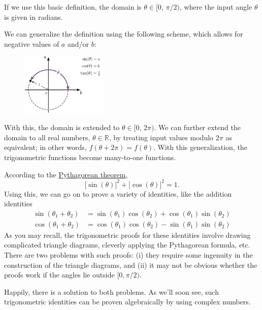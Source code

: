 \documentclass[10pt,a4paper]{article}
\begin{document}
\noindent
If we use this basic definition, the domain is $\theta \in [0,
  \,\pi/2)$, where the input angle $\theta$ is given in radians.

We can generalize the definition using the following scheme, which
allows for negative values of $a$ and/or $b$:

\begin{figure}[h!]
  \centering\includegraphics[width=0.37\textwidth]{trigonometry2}
\end{figure}

\noindent
With this, the domain is extended to $\theta \in [0,\,2\pi)$. We can
further extend the domain to all real numbers, $\theta \in
\mathbb{R}$, by treating input values modulo $2\pi$ as equivalent; in
other words, $f(\theta + 2\pi) = f(\theta)$. With this generalization,
the trigonometric functions become many-to-one functions.

According to the
\href{http://www.faculty.umb.edu/gary_zabel/Courses/Phil\%20281b/Philosophy\%20of\%20Magic/Arcana/Neoplatonism/Pythagoras/index.shtml.html}{Pythagorean
theorem},
\begin{equation}
  \big[\sin(\theta)\big]^2 + \big[\cos(\theta)\big]^2 = 1.
\end{equation}
Using this, we can go on to prove a variety of identities, like the
addition identities
\begin{align}
  \sin(\theta_1 + \theta_2) &= \sin(\theta_1) \cos(\theta_2) + \cos(\theta_1)\sin(\theta_2) \\
  \cos(\theta_1 + \theta_2) &= \cos(\theta_1) \cos(\theta_2) - \sin(\theta_1)\sin(\theta_2)
\end{align}
As you may recall, the trigonometric proofs for these identities
involve drawing complicated triangle diagrams, cleverly applying the
Pythagorean formula, etc. There are two problems with such proofs: (i)
they require some ingenuity in the construction of the triangle
diagrams, and (ii) it may not be obvious whether the proofs work if
the angles lie outside $[0,\pi/2)$.

Happily, there is a solution to both problems. As we'll soon see, such
trigonometric identities can be proven algebraically by using complex
numbers.
\end{document}
